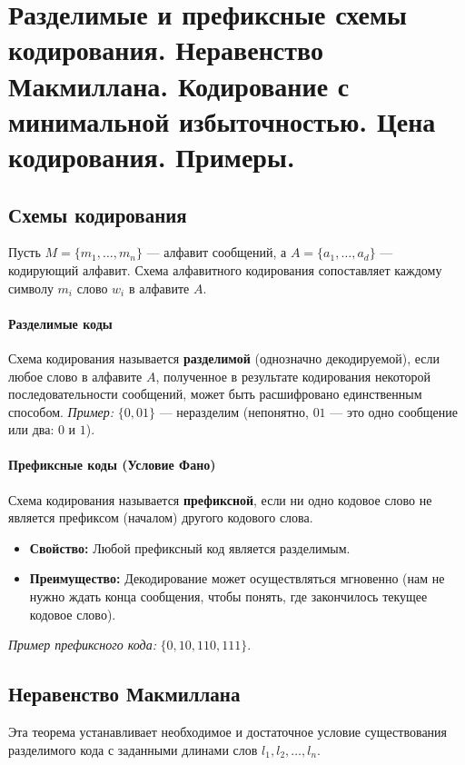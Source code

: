 \section{Разделимые и префиксные схемы кодирования. Неравенство Макмиллана. Кодирование с минимальной избыточностью. Цена кодирования. Примеры.}

\subsection*{Схемы кодирования}

Пусть $M = \{m_1, \dots, m_n\}$ — алфавит сообщений, а $A = \{a_1, \dots, a_d\}$ — кодирующий алфавит. Схема алфавитного кодирования сопоставляет каждому символу $m_i$ слово $w_i$ в алфавите $A$.

\paragraph{Разделимые коды}
Схема кодирования называется \textbf{разделимой} (однозначно декодируемой), если любое слово в алфавите $A$, полученное в результате кодирования некоторой последовательности сообщений, может быть расшифровано единственным способом.
\textit{Пример:} $\{0, 01\}$ — неразделим (непонятно, $01$ — это одно сообщение или два: $0$ и $1$).

\paragraph{Префиксные коды (Условие Фано)}
Схема кодирования называется \textbf{префиксной}, если ни одно кодовое слово не является префиксом (началом) другого кодового слова.
\begin{itemize}
    \item \textbf{Свойство:} Любой префиксный код является разделимым.
    \item \textbf{Преимущество:} Декодирование может осуществляться мгновенно (нам не нужно ждать конца сообщения, чтобы понять, где закончилось текущее кодовое слово).
\end{itemize}
\textit{Пример префиксного кода:} $\{0, 10, 110, 111\}$.

\subsection*{Неравенство Макмиллана}

Эта теорема устанавливает необходимое и достаточное условие существования разделимого кода с заданными длинами слов $l_1, l_2, \dots, l_n$.

